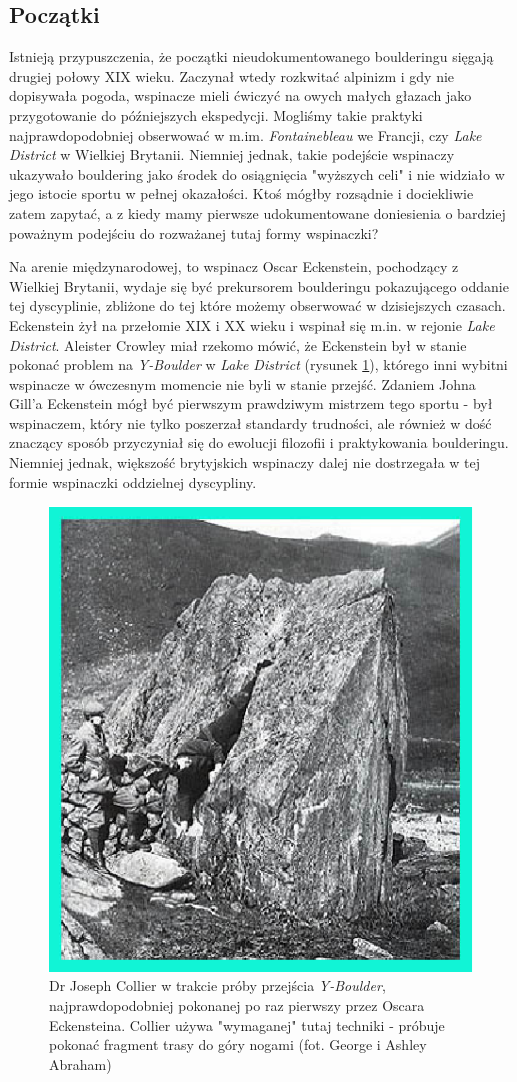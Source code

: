 \documentclass{article}
\begin{document}
\subsection{Początki}
Istnieją przypuszczenia, że początki nieudokumentowanego boulderingu sięgają drugiej połowy XIX wieku. Zaczynał wtedy rozkwitać alpinizm i gdy nie dopisywała pogoda, wspinacze mieli ćwiczyć na owych małych głazach jako przygotowanie do późniejszych ekspedycji. Mogliśmy takie praktyki najprawdopodobniej obserwować w m.im. \textit{Fontainebleau} we Francji, czy \textit{Lake District} w Wielkiej Brytanii. Niemniej jednak, takie podejście wspinaczy ukazywało bouldering jako środek do osiągnięcia "wyższych celi" i nie widziało w jego istocie sportu w pełnej okazałości. Ktoś mógłby rozsądnie i dociekliwie zatem zapytać, a z kiedy mamy pierwsze udokumentowane doniesienia o bardziej poważnym podejściu do rozważanej tutaj formy wspinaczki?

Na arenie międzynarodowej, to wspinacz Oscar Eckenstein, pochodzący z Wielkiej Brytanii, wydaje się być prekursorem boulderingu pokazującego oddanie tej dyscyplinie, zbliżone do tej które możemy obserwować w dzisiejszych czasach. Eckenstein żył na przełomie XIX i XX wieku i wspinał się m.in. w rejonie \textit{Lake District}. Aleister Crowley miał rzekomo mówić, że Eckenstein był w stanie pokonać problem na \textit{Y-Boulder} w \textit{Lake District} (rysunek \ref{collier}), którego inni wybitni wspinacze w ówczesnym momencie nie byli w stanie przejść. Zdaniem Johna Gill'a Eckenstein mógł być pierwszym prawdziwym mistrzem tego sportu - był wspinaczem, który nie tylko poszerzał standardy trudności, ale również w dość znaczący sposób przyczyniał się do ewolucji filozofii i praktykowania boulderingu. Niemniej jednak, większość brytyjskich wspinaczy dalej nie dostrzegała w tej formie wspinaczki oddzielnej dyscypliny.

\begin{figure}[!htbp]
	\begin{center}
		\includegraphics[width=0.5\linewidth]{images/y-boulder-collier.eps}
	\end{center}
	\caption{Dr Joseph Collier w trakcie próby przejścia \textit{Y-Boulder}, najprawdopodobniej pokonanej po raz pierwszy przez Oscara Eckensteina. Collier używa "wymaganej" tutaj techniki - próbuje pokonać fragment trasy do góry nogami (fot. George i Ashley Abraham) \cite{gill-history}}
	\label{collier}
\end{figure}
\end{document}
